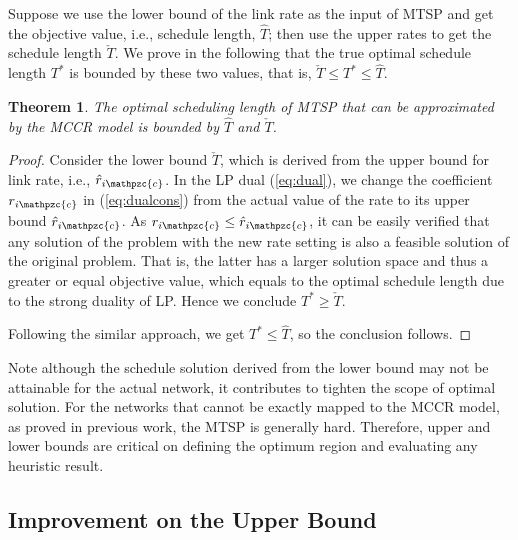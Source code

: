 \documentclass[10pt,onecolumn,journal,draftcls,oneside]{IEEEtran}
\newtheorem{theorem}{Theorem}
\newcommand{\Cc}{\mathpzc{c}}
\begin{document}
Suppose we use the lower bound of the link rate as the input of MTSP and get the objective value, i.e., schedule length, ${\hat T}$; then use the upper rates to get the schedule length ${\check T}$. We prove in the following that the true optimal schedule length ${T^*}$ is bounded by these two values, that is, ${\check T} \leq {T^*} \leq {\hat T}$.


\begin{theorem}
\label{theo:bounds}
The optimal scheduling length of MTSP that can be approximated by the MCCR model is bounded by ${\hat T}$ and ${\check T}$.
\end{theorem}

\begin{proof}
Consider the lower bound ${\check T}$, which is derived from the upper bound for link rate, i.e., $\hat r_{i\Cc}$. In the LP dual (\ref{eq:dual}), we change the coefficient $r_{i\Cc}$ in (\ref{eq:dualcons}) from the actual value of the rate to its upper bound $\hat r_{i\Cc}$. As $r_{i\Cc} \leq \hat r_{i\Cc}$, it can be easily verified that any solution of the problem with the new rate setting is also a feasible solution of the original problem. That is, the latter has a larger solution space and thus a greater or equal objective value, which equals to the optimal schedule length due to the strong duality of LP. Hence we conclude ${T^*} \geq {\check T}$. 

Following the similar approach, we get ${T^*} \leq {\hat T}$, so the conclusion follows.
\end{proof}







Note although the schedule solution derived from the lower bound may not be attainable for the actual network, it contributes to tighten the scope of optimal solution.  For the networks that cannot be exactly mapped to the MCCR model, as proved in previous work, the MTSP is generally hard. Therefore, upper and lower bounds are critical on defining the optimum region and evaluating any heuristic result. 

\subsection{Improvement on the Upper Bound}
\label{sec:vd}
\end{document}
